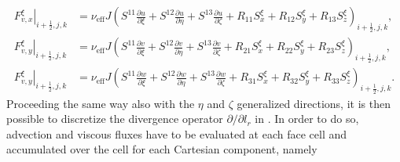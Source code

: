 \begin{align}
	\left.F^\xi_{v, x}\right|_{i+\frac{1}{2}, j, k} & =\nu_\text{eff} J\left(S^{11} \frac{\partial u}{\partial \xi}+S^{12} \frac{\partial u}{\partial \eta}+S^{13} \frac{\partial u}{\partial \zeta}+R_{11} S_x^{\xi}+R_{12} S_y^{\xi}+R_{13} S_z^{\xi}\right)_{i+\frac{1}{2}, j, k}, \nonumber \\
	\left.F^\xi_{v, y}\right|_{i+\frac{1}{2}, j, k} & =\nu_\text{eff} J\left(S^{11} \frac{\partial v}{\partial \xi}+S^{12} \frac{\partial v}{\partial \eta}+S^{13} \frac{\partial v}{\partial \zeta}+R_{21} S_x^{\xi}+R_{22} S_y^{\xi}+R_{23} S_z^{\xi}\right)_{i+\frac{1}{2}, j, k}, \nonumber \\
	\left.F^\xi_{v, y}\right|_{i+\frac{1}{2}, j, k} & =\nu_\text{eff} J\left(S^{11} \frac{\partial w}{\partial \xi}+S^{12} \frac{\partial w}{\partial \eta}+S^{13} \frac{\partial w}{\partial \zeta}+R_{31} S_x^{\xi}+R_{32} S_y^{\xi}+R_{33} S_z^{\xi}\right)_{i+\frac{1}{2}, j, k}.
	\label{eq:viscousFluxes}
\end{align}
Proceeding the same way also with the $\eta$ and $\zeta$ generalized directions, it is then possible to discretize the divergence operator $\partial/\partial l_r$ in . In order to do so, advection and viscous fluxes have to be evaluated at each face cell and accumulated over the cell for each Cartesian component, namely
